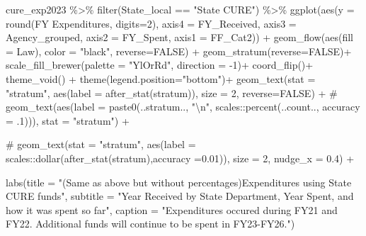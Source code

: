 \documentclass[
  letterpaper,
  DIV=11,
  numbers=noendperiod]{scrreport}
\newenvironment{Shaded}{\begin{snugshade}}{\end{snugshade}}
\newcommand{\AttributeTok}[1]{\textcolor[rgb]{0.40,0.45,0.13}{#1}}
\newcommand{\CommentTok}[1]{\textcolor[rgb]{0.37,0.37,0.37}{#1}}
\newcommand{\ConstantTok}[1]{\textcolor[rgb]{0.56,0.35,0.01}{#1}}
\newcommand{\DecValTok}[1]{\textcolor[rgb]{0.68,0.00,0.00}{#1}}
\newcommand{\FunctionTok}[1]{\textcolor[rgb]{0.28,0.35,0.67}{#1}}
\newcommand{\NormalTok}[1]{\textcolor[rgb]{0.00,0.23,0.31}{#1}}
\newcommand{\SpecialCharTok}[1]{\textcolor[rgb]{0.37,0.37,0.37}{#1}}
\newcommand{\StringTok}[1]{\textcolor[rgb]{0.13,0.47,0.30}{#1}}
\begin{document}
\begin{Shaded}
\begin{Highlighting}[]
\NormalTok{cure\_exp2023 }\SpecialCharTok{\%\textgreater{}\%} 
  \FunctionTok{filter}\NormalTok{(State\_local }\SpecialCharTok{==} \StringTok{"State CURE"}\NormalTok{) }\SpecialCharTok{\%\textgreater{}\%}
  \FunctionTok{ggplot}\NormalTok{(}\FunctionTok{aes}\NormalTok{(}\AttributeTok{y =} \FunctionTok{round}\NormalTok{(}\StringTok{\textasciigrave{}}\AttributeTok{FY Expenditures}\StringTok{\textasciigrave{}}\NormalTok{, }\AttributeTok{digits=}\DecValTok{2}\NormalTok{), }
             \AttributeTok{axis4 =}\NormalTok{ FY\_Received, }
             \AttributeTok{axis3 =}\NormalTok{ Agency\_grouped,  }
             \AttributeTok{axis2 =}\NormalTok{ FY\_Spent, }
             \AttributeTok{axis1 =}\NormalTok{ FF\_Cat2)) }\SpecialCharTok{+}
  \FunctionTok{geom\_flow}\NormalTok{(}\FunctionTok{aes}\NormalTok{(}\AttributeTok{fill =}\NormalTok{ Law), }\AttributeTok{color =} \StringTok{"black"}\NormalTok{, }\AttributeTok{reverse=}\ConstantTok{FALSE}\NormalTok{) }\SpecialCharTok{+}
  \FunctionTok{geom\_stratum}\NormalTok{(}\AttributeTok{reverse=}\ConstantTok{FALSE}\NormalTok{)}\SpecialCharTok{+}
  \FunctionTok{scale\_fill\_brewer}\NormalTok{(}\AttributeTok{palette =} \StringTok{"YlOrRd"}\NormalTok{, }\AttributeTok{direction =} \SpecialCharTok{{-}}\DecValTok{1}\NormalTok{)}\SpecialCharTok{+}
  \FunctionTok{coord\_flip}\NormalTok{()}\SpecialCharTok{+}
  \FunctionTok{theme\_void}\NormalTok{() }\SpecialCharTok{+} 
  \FunctionTok{theme}\NormalTok{(}\AttributeTok{legend.position=}\StringTok{"bottom"}\NormalTok{)}\SpecialCharTok{+}
 \FunctionTok{geom\_text}\NormalTok{(}\AttributeTok{stat =} \StringTok{"stratum"}\NormalTok{, }\FunctionTok{aes}\NormalTok{(}\AttributeTok{label =} \FunctionTok{after\_stat}\NormalTok{(stratum)), }\AttributeTok{size =} \DecValTok{2}\NormalTok{, }\AttributeTok{reverse=}\ConstantTok{FALSE}\NormalTok{) }\SpecialCharTok{+}
\CommentTok{\#  geom\_text(aes(label = paste0(..stratum.., "\textbackslash{}n", scales::percent(..count.., accuracy = .1))), stat = "stratum") +}

 \CommentTok{\# geom\_text(stat = "stratum", aes(label = scales::dollar(after\_stat(stratum),accuracy =0.01)), size = 2, nudge\_x = 0.4) +}

  \FunctionTok{labs}\NormalTok{(}\AttributeTok{title =} \StringTok{"(Same as above but without percentages)Expenditures using State CURE funds"}\NormalTok{, }
  \AttributeTok{subtitle =} \StringTok{"Year Received by State Department, Year Spent, and how it was spent so far"}\NormalTok{, }\AttributeTok{caption =} \StringTok{"Expenditures occured during FY21 and FY22. }
\StringTok{       Additional funds will continue to be spent in FY23{-}FY26."}\NormalTok{)}
\end{Highlighting}
\end{Shaded}
\end{document}
